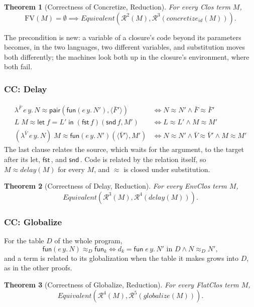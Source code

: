 \documentclass[10pt]{article}
\theoremstyle{acmplain}
\newtheorem{theorem}{Theorem}[section]
\newcommand{\key}[1]{\mathsf{#1}}
\newcommand{\pass}[1]{\mathit{#1}}
\newcommand{\clos}[2]{\lambda^{#1}\, #2.\,}
\newcommand{\Let}{\key{let}\;}
\newcommand{\In}{\;\key{in}\;}
\newcommand{\tuple}[1]{\langle #1 \rangle}
\newcommand{\fun}[1]{\key{fun}(#1)}
\newcommand{\funref}[1]{\key{fun}_{#1}}
\newcommand{\pair}[2]{\key{pair}(#1, #2)}
\newcommand{\FST}{\key{fst}\,}
\newcommand{\SND}{\key{snd}\,}
\newcommand{\FV}{\mathrm{FV}}
\newcommand{\Equiv}{\mathit{Equivalent}}
\begin{document}
\begin{theorem}[Correctness of Concretize, Reduction]\label{thm:concretize-red}
For every Clos term $M$,
\[
  \FV(M) = \emptyset \implies \Equiv(\mathcal{R}^{2}(M), \mathcal{R}^{3}(\pass{concretize}_{\mathit{id}}(M))) .
\]
\end{theorem}
The precondition is new: a variable of a closure's code beyond its
parameters becomes, in the two languages, two different variables, and
substitution moves both differently; the machines look both up in the
closure's environment, where both fail.

\subsubsection{CC: Delay}

\begin{align*}
  \clos{\bar{F}}{e\, y} N \approx \pair{\fun{e\,y.\,N'}}{\tuple{\bar{F}'}} &\iff N \approx N' \land \bar{F} \approx \bar{F}' \\
  L\;M \approx \Let f = L' \In (\FST f)(\SND f, M') &\iff L \approx L' \land M \approx M' \\
  (\clos{\bar{V}}{e\, y} N)\;M \approx \fun{e\,y.\,N'}(\tuple{\bar{V}'}, M') &\iff
    N \approx N' \land \bar{V} \approx \bar{V}' \land M \approx M'
\end{align*}
The last clause relates the source, which waits for the argument, to the
target after its let, $\FST$, and $\SND$. Code is related by the relation
itself, so $M \approx \pass{delay}(M)$ for every $M$, and $\approx$ is closed
under substitution.
\begin{theorem}[Correctness of Delay, Reduction]\label{thm:delay-red}
For every EnvClos term $M$,
\[
  \Equiv(\mathcal{R}^{3}(M), \mathcal{R}^{4}(\pass{delay}(M))) .
\]
\end{theorem}

\subsubsection{CC: Globalize}

For the table $D$ of the whole program,
\[
  \fun{e\,y.\,N} \approx_D \funref{k} \iff d_k = \key{fun}\; e\,y.\,N' \text{ in } D \land N \approx_D N' ,
\]
and a term is related to its globalization when the table it makes grows
into $D$, as in the other proofs.
\begin{theorem}[Correctness of Globalize, Reduction]\label{thm:globalize-red}
For every FlatClos term $M$,
\[
  \Equiv(\mathcal{R}^{4}(M), \mathcal{R}^{5}(\pass{globalize}(M))) .
\]
\end{theorem}
\end{document}

